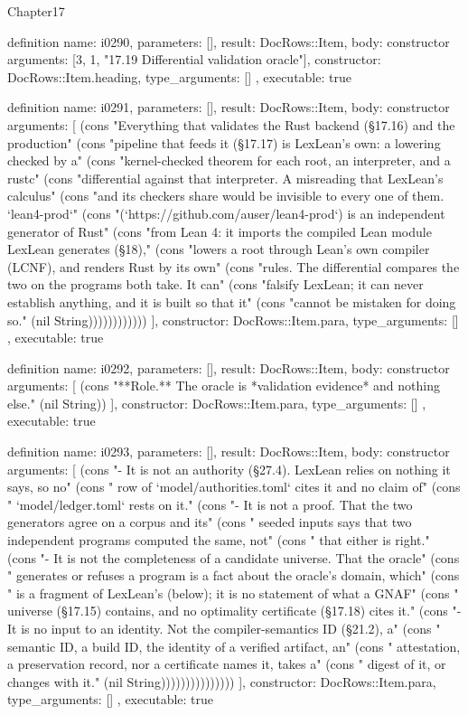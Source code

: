 \begin{lexlean}{Chapter17}
\begin{semanticmodule}
definition{
  name: i0290,
  parameters: [],
  result: DocRows::Item,
  body: constructor{
    arguments: [3, 1, "17.19 Differential validation oracle"],
    constructor: DocRows::Item.heading,
    type_arguments: []
  },
  executable: true
}

definition{
  name: i0291,
  parameters: [],
  result: DocRows::Item,
  body: constructor{
    arguments: [
      (cons "Everything that validates the Rust backend (§17.16) and the production" (cons "pipeline that feeds it (§17.17) is LexLean's own: a lowering checked by a" (cons "kernel-checked theorem for each root, an interpreter, and a rustc" (cons "differential against that interpreter. A misreading that LexLean's calculus" (cons "and its checkers share would be invisible to every one of them. `lean4-prod`" (cons "(`https://github.com/auser/lean4-prod`) is an independent generator of Rust" (cons "from Lean 4: it imports the compiled Lean module LexLean generates (§18)," (cons "lowers a root through Lean's own compiler (LCNF), and renders Rust by its own" (cons "rules. The differential compares the two on the programs both take. It can" (cons "falsify LexLean; it can never establish anything, and it is built so that it" (cons "cannot be mistaken for doing so." (nil String))))))))))))
    ],
    constructor: DocRows::Item.para,
    type_arguments: []
  },
  executable: true
}

definition{
  name: i0292,
  parameters: [],
  result: DocRows::Item,
  body: constructor{
    arguments: [
      (cons "**Role.** The oracle is *validation evidence* and nothing else." (nil String))
    ],
    constructor: DocRows::Item.para,
    type_arguments: []
  },
  executable: true
}

definition{
  name: i0293,
  parameters: [],
  result: DocRows::Item,
  body: constructor{
    arguments: [
      (cons "- It is not an authority (§27.4). LexLean relies on nothing it says, so no" (cons "  row of `model/authorities.toml` cites it and no claim of" (cons "  `model/ledger.toml` rests on it." (cons "- It is not a proof. That the two generators agree on a corpus and its" (cons "  seeded inputs says that two independent programs computed the same, not" (cons "  that either is right." (cons "- It is not the completeness of a candidate universe. That the oracle" (cons "  generates or refuses a program is a fact about the oracle's domain, which" (cons "  is a fragment of LexLean's (below); it is no statement of what a GNAF" (cons "  universe (§17.15) contains, and no optimality certificate (§17.18) cites it." (cons "- It is no input to an identity. Not the compiler-semantics ID (§21.2), a" (cons "  semantic ID, a build ID, the identity of a verified artifact, an" (cons "  attestation, a preservation record, nor a certificate names it, takes a" (cons "  digest of it, or changes with it." (nil String)))))))))))))))
    ],
    constructor: DocRows::Item.para,
    type_arguments: []
  },
  executable: true
}


\end{semanticmodule}
\end{lexlean}
